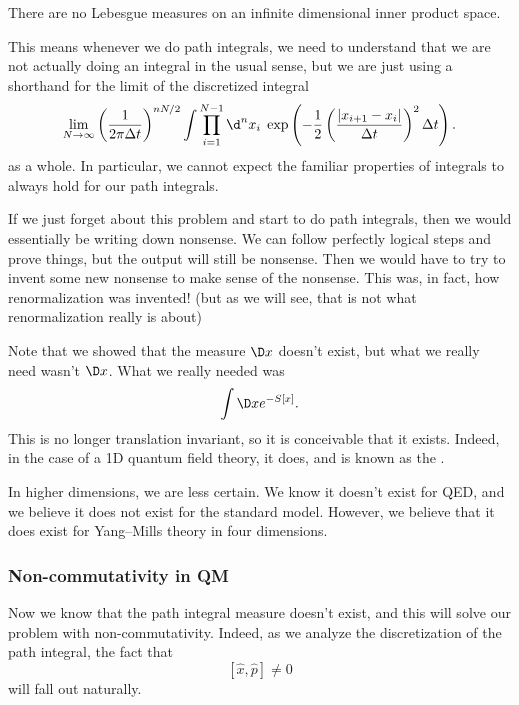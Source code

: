\documentclass[a4paper]{article}
\begin{document}
\begin{thm}
  There are no Lebesgue measures on an infinite dimensional inner product space.
\end{thm}

This means whenever we do path integrals, we need to understand that we are not actually doing an integral in the usual sense, but we are just using a shorthand for the limit of the discretized integral
\[
  \lim_{N \to \infty} \left(\frac{1}{2\pi \Delta t}\right)^{nN/2} \int \prod_{i = 1}^{N - 1} \d^n x_i\; \exp\left(- \frac{1}{2}\left(\frac{|x_{i + 1}- x_i|}{\Delta t}\right)^2 \Delta t\right).
\]
as a whole. In particular, we cannot expect the familiar properties of integrals to always hold for our path integrals.

If we just forget about this problem and start to do path integrals, then we would essentially be writing down nonsense. We can follow perfectly logical steps and prove things, but the output will still be nonsense. Then we would have to try to invent some new nonsense to make sense of the nonsense. This was, in fact, how renormalization was invented! (but as we will see, that is not what renormalization really is about)

Note that we showed that the measure $\D x$ doesn't exist, but what we really need wasn't $\D x$. What we really needed was
\[
  \int \D x e^{-S[x]}.
\]
This is no longer translation invariant, so it is conceivable that it exists. Indeed, in the case of a 1D quantum field theory, it does, and is known as the .

In higher dimensions, we are less certain. We know it doesn't exist for QED, and we believe it does not exist for the standard model. However, we believe that it does exist for Yang--Mills theory in four dimensions.

\subsubsection*{Non-commutativity in QM}
Now we know that the path integral measure doesn't exist, and this will solve our problem with non-commutativity. Indeed, as we analyze the discretization of the path integral, the fact that
\[
  [\hat{x}, \hat{p}] \not= 0
\]
will fall out naturally.
\end{document}
